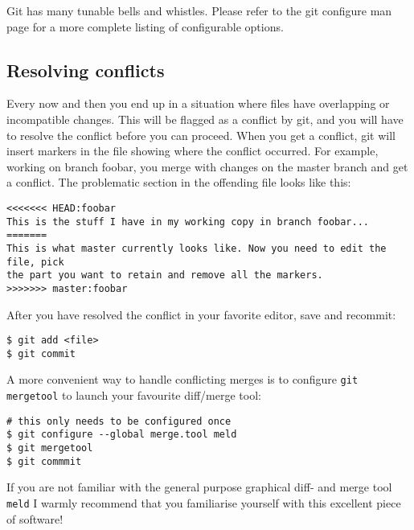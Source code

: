 \documentclass[a4paper,10pt]{article}
\begin{document}
Git has many tunable bells and whistles. Please refer to the git configure
man page for a more complete listing of configurable options.

\subsection{Resolving conflicts}
\label{sec:conflict}
Every now and then you end up in a situation where files have overlapping or
incompatible changes. This will be flagged as a conflict by git, and you will
have to resolve the conflict before you can proceed. When you get a conflict,
git will insert markers in the file showing where the conflict occurred. For
example, working on branch foobar, you merge with changes on the master branch
and get a conflict. The problematic section in the offending file looks like
this:
\begin{verbatim}
<<<<<<< HEAD:foobar
This is the stuff I have in my working copy in branch foobar...
=======
This is what master currently looks like. Now you need to edit the file, pick
the part you want to retain and remove all the markers.
>>>>>>> master:foobar
\end{verbatim}
After you have resolved the conflict in your favorite editor, save and
recommit:
\begin{verbatim}
$ git add <file>
$ git commit
\end{verbatim}
A more convenient way to handle conflicting merges is to configure
\texttt{git mergetool} to launch your favourite diff/merge tool:
\begin{verbatim}
# this only needs to be configured once
$ git configure --global merge.tool meld
$ git mergetool
$ git commmit
\end{verbatim}
If you are not familiar with the general purpose graphical diff- and merge
tool \texttt{meld} I warmly recommend that you familiarise yourself with this
excellent piece of software!
\end{document}
